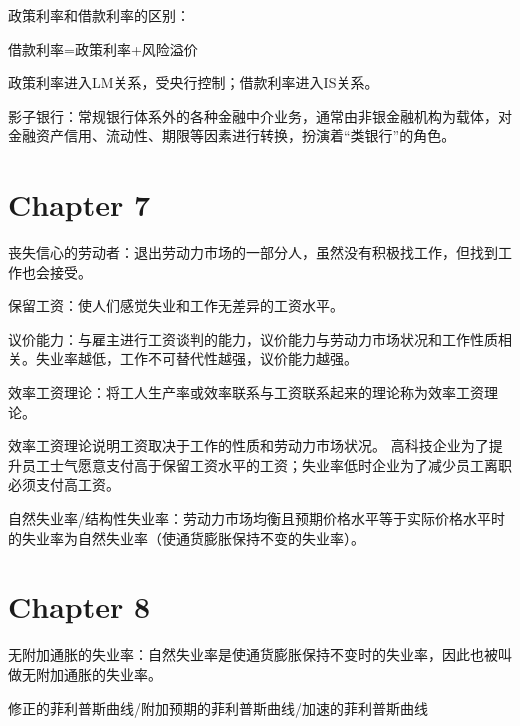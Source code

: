 \documentclass{article}
\begin{document}
\hspace*{\fill}

政策利率和借款利率的区别：

借款利率=政策利率+风险溢价

政策利率进入LM关系，受央行控制；借款利率进入IS关系。

\hspace*{\fill}

影子银行：常规银行体系外的各种金融中介业务，通常由非银金融机构为载体，对金融资产信用、流动性、期限等因素进行转换，扮演着“类银行”的角色。

\section{Chapter 7}

丧失信心的劳动者：退出劳动力市场的一部分人，虽然没有积极找工作，但找到工作也会接受。

\hspace*{\fill}

保留工资：使人们感觉失业和工作无差异的工资水平。

\hspace*{\fill}

议价能力：与雇主进行工资谈判的能力，议价能力与劳动力市场状况和工作性质相关。失业率越低，工作不可替代性越强，议价能力越强。

\hspace*{\fill}

效率工资理论：将工人生产率或效率联系与工资联系起来的理论称为效率工资理论。

效率工资理论说明工资取决于工作的性质和劳动力市场状况。
高科技企业为了提升员工士气愿意支付高于保留工资水平的工资；失业率低时企业为了减少员工离职必须支付高工资。

\hspace*{\fill}

自然失业率/结构性失业率：劳动力市场均衡且预期价格水平等于实际价格水平时的失业率为自然失业率（使通货膨胀保持不变的失业率）。

\section{Chapter 8}

无附加通胀的失业率：自然失业率是使通货膨胀保持不变时的失业率，因此也被叫做无附加通胀的失业率。

\hspace*{\fill}

修正的菲利普斯曲线/附加预期的菲利普斯曲线/加速的菲利普斯曲线
\end{document}
